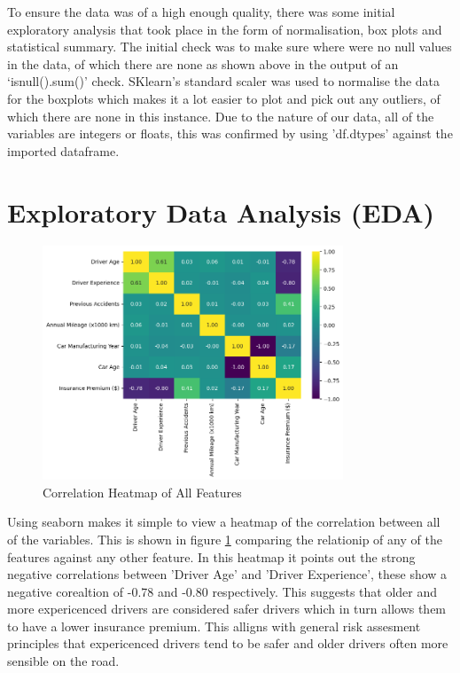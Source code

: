 \documentclass{article}
\begin{document}
To ensure the data was of a high enough quality, there was some initial exploratory analysis that took place in the form of normalisation, box plots and statistical summary. The initial check was to make sure where were no null values in the data, of which there are none as shown above in the output of an `isnull().sum()' check. SKlearn's standard scaler \cite{scikit_scaler} was used to normalise the data for the boxplots which makes it a lot easier to plot and pick out any outliers, of which there are none in this instance. Due to the nature of our data, all of the variables are integers or floats, this was confirmed by using 'df.dtypes' against the imported dataframe.


\section{Exploratory Data Analysis (EDA)}

\begin{figure}[h]
\centering
\includegraphics[width=0.8\textwidth]{heatmap.png}
\caption{Correlation Heatmap of All Features}\label{fig:heatmap}
\end{figure}

Using seaborn makes it simple to view a heatmap of the correlation between all of the variables. This is shown in figure \ref{fig:heatmap} comparing the relationip of any of the features against any other feature. In this heatmap it points out the strong negative correlations between 'Driver Age' and 'Driver Experience', these show a negative corealtion of -0.78 and -0.80 respectively. This suggests that older and more expericenced drivers are considered safer drivers which in turn allows them to have a lower insurance premium. This alligns with general risk assesment principles that expericenced drivers tend to be safer and older drivers often more sensible on the road. 
\end{document}
